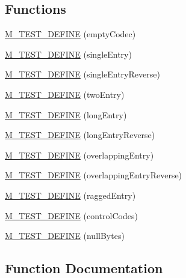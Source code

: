 \subsection*{Functions}
\begin{DoxyCompactItemize}
\item 
\mbox{\hyperlink{test_2text-codec_8c_a50135e1d28f686504681d5bb103978ac}{M\+\_\+\+T\+E\+S\+T\+\_\+\+D\+E\+F\+I\+NE}} (empty\+Codec)
\item 
\mbox{\hyperlink{test_2text-codec_8c_a680dac09ca0fbc2796d1f2bf578f04b8}{M\+\_\+\+T\+E\+S\+T\+\_\+\+D\+E\+F\+I\+NE}} (single\+Entry)
\item 
\mbox{\hyperlink{test_2text-codec_8c_ad849fd92e39bf828836b7d727b96a908}{M\+\_\+\+T\+E\+S\+T\+\_\+\+D\+E\+F\+I\+NE}} (single\+Entry\+Reverse)
\item 
\mbox{\hyperlink{test_2text-codec_8c_a1772bb50efde34179f442d68c52165d5}{M\+\_\+\+T\+E\+S\+T\+\_\+\+D\+E\+F\+I\+NE}} (two\+Entry)
\item 
\mbox{\hyperlink{test_2text-codec_8c_a977162a68a067898ba1f694e38b9fcbf}{M\+\_\+\+T\+E\+S\+T\+\_\+\+D\+E\+F\+I\+NE}} (long\+Entry)
\item 
\mbox{\hyperlink{test_2text-codec_8c_a81ab19cdf1e7f3e28fb9f78623b8654d}{M\+\_\+\+T\+E\+S\+T\+\_\+\+D\+E\+F\+I\+NE}} (long\+Entry\+Reverse)
\item 
\mbox{\hyperlink{test_2text-codec_8c_a571343fc6b66545e286e7d5a9101a4af}{M\+\_\+\+T\+E\+S\+T\+\_\+\+D\+E\+F\+I\+NE}} (overlapping\+Entry)
\item 
\mbox{\hyperlink{test_2text-codec_8c_a953cf8da8f251cedf92bdc7b4aed9605}{M\+\_\+\+T\+E\+S\+T\+\_\+\+D\+E\+F\+I\+NE}} (overlapping\+Entry\+Reverse)
\item 
\mbox{\hyperlink{test_2text-codec_8c_a9d612bfb4e7c9d0dff56b9b4160a528f}{M\+\_\+\+T\+E\+S\+T\+\_\+\+D\+E\+F\+I\+NE}} (ragged\+Entry)
\item 
\mbox{\hyperlink{test_2text-codec_8c_a7fcb7ef913d255336d6673f6636e2a05}{M\+\_\+\+T\+E\+S\+T\+\_\+\+D\+E\+F\+I\+NE}} (control\+Codes)
\item 
\mbox{\hyperlink{test_2text-codec_8c_af3a282605828c0cb1ae2fc0c5635c566}{M\+\_\+\+T\+E\+S\+T\+\_\+\+D\+E\+F\+I\+NE}} (null\+Bytes)
\end{DoxyCompactItemize}


\subsection{Function Documentation}
\mbox{\label{test_2text-codec_8c_a50135e1d28f686504681d5bb103978ac}} 
